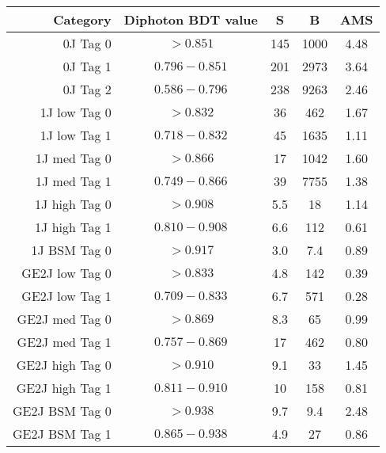 \begin{tabular}{ r | c | c | c | c } 
\hline 
Category         & Diphoton BDT value & S      & B          & AMS \\
\hline 
0J Tag 0         & $ > 0.851$            & 145    & 1000       & 4.48                    \\
0J Tag 1         & $0.796-0.851$            & 201    & 2973       & 3.64                    \\
0J Tag 2         & $0.586-0.796$            & 238    & 9263       & 2.46                    \\
\hline           
1J low  Tag 0    & $ > 0.832$            & 36     & 462        & 1.67                    \\
1J low  Tag 1    & $0.718-0.832$            & 45     & 1635       & 1.11                    \\
1J med  Tag 0    & $ > 0.866$            & 17     & 1042       & 1.60                    \\
1J med  Tag 1    & $0.749-0.866$            & 39     & 7755       & 1.38                    \\
1J high Tag 0    & $ > 0.908$            & 5.5    & 18         & 1.14                    \\
1J high Tag 1    & $0.810-0.908$            & 6.6    & 112        & 0.61                    \\
1J BSM  Tag 0    & $ > 0.917$            & 3.0    & 7.4        & 0.89                    \\
\hline           
GE2J low  Tag 0  & $ > 0.833$            & 4.8    & 142        & 0.39                    \\
GE2J low  Tag 1  & $0.709-0.833$            & 6.7    & 571        & 0.28                    \\
GE2J med  Tag 0  & $ > 0.869$            & 8.3    & 65         & 0.99                    \\
GE2J med  Tag 1  & $0.757-0.869$            & 17     & 462        & 0.80                    \\
GE2J high Tag 0  & $ > 0.910$            & 9.1    & 33         & 1.45                    \\
GE2J high Tag 1  & $0.811-0.910$            & 10     & 158        & 0.81                    \\
GE2J BSM  Tag 0  & $ > 0.938$            & 9.7    & 9.4        & 2.48                    \\
GE2J BSM  Tag 1  & $0.865-0.938$            & 4.9    & 27         & 0.86                    \\
\hline 
\end{tabular}
